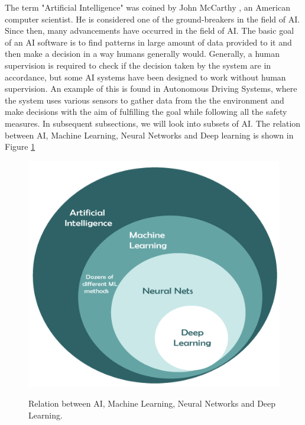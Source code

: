 \documentclass[en,]{template/rrlab}
\begin{document}
The term "Artificial Intelligence" was coined by John McCarthy \cite{dartmouth}, an American computer scientist. He is considered one of the ground-breakers in the field of AI. Since then, many advancements have occurred in the field of AI. The basic goal of an AI software is to find patterns in large amount of data provided to it and then make a decision in a way humans generally would. Generally, a human supervision is required to check if the decision taken by the system are in accordance, but some AI systems have been designed to work without human supervision. An example of this is found in Autonomous Driving Systems, where the system uses various sensors to gather data from the the environment and make decisions with the aim of fulfilling the goal while following all the safety measures. In subsequent subsections, we will look into subsets of AI. The relation between AI, Machine Learning, Neural Networks and Deep learning is shown in Figure \ref{fig:chapter-2_ai_ml_dl}

\begin{figure}[ht]
    \centering
    \includegraphics[height=0.5\textwidth]{figures/deep-learning-vs-machine-learning-vs-artificial-intelligence1.png}
    \caption{Relation between AI, Machine Learning, Neural Networks and Deep Learning.}
    \cite{ai-ml-dl, https://www.researchgate.net/figure/Relationship-between-artificial-intelligence-machine-learning-neural-network-and-deep_fig3_354124420}
    \label{fig:chapter-2_ai_ml_dl}
\end{figure}
\end{document}

